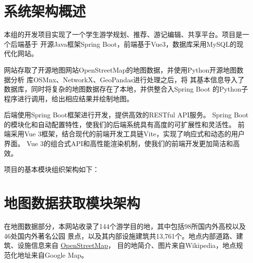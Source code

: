 \documentclass{report}
\begin{document}
\section{系统架构概述}
本组的开发项目实现了一个学生游学规划、推荐、游记编辑、共享平台。项目是一个后端基于
开源Java框架Spring Boot，前端基于Vue3，数据库采用MySQL的现代化网站。
\par
网站存取了开源地图网站OpenStreetMap的地图数据，并使用Python开源地图数据分析
库OSMnx、NetworkX、GeoPandas进行处理之后，将
其基本信息导入了数据库，同时将复杂的地图数据存在了本地，并供整合入Spring Boot
的Python子程序进行调用，给出相应结果并绘制地图。
\par
后端使用Spring Boot框架进行开发，提供高效的RESTful API服务。
Spring Boot的模块化和自动配置特性，使我们的后端系统具有高度的可扩展性和灵活性。
前端采用Vue 3框架，结合现代的前端开发工具链Vite，实现了响应式和动态的用户界面。
Vue 3的组合式API和高性能渲染机制，使我们的前端开发更加简洁和高效。
\par
项目的基本模块组织架构如下：
\begin{figure}[h]
    \begin{center}
    \end{center}
\end{figure}
\par




\section{地图数据获取模块架构}
\par
在地图数据部分，本网站收录了144个游学目的地，其中包括98所国内外高校以及46处国内外著名公园
景点，以及其内部设施建筑共13,761个。地点内部道路、建筑、设施信息来自
\href{openstreetmap.org}{OpenStreetMap}，
目的地简介、图片来自Wikipedia，地点规范化地址来自Google Map。
\par
\end{document}
